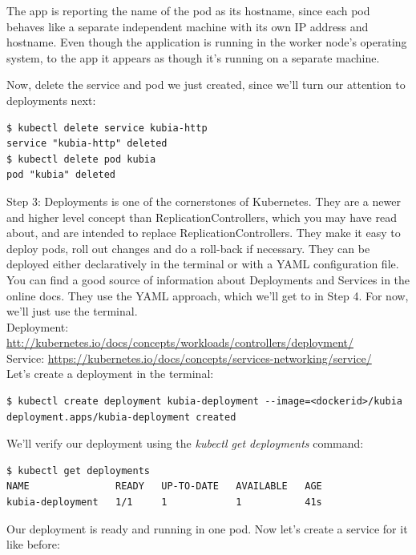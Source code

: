 \documentclass[a4paper,10pt]{article}
\begin{document}
The app is reporting the name of the pod as its hostname, since each pod behaves like a separate independent machine with its own IP address and hostname. Even though the application is running in the worker node's operating system, to the app it appears as though it's running on a separate machine.

Now, delete the service and pod we just created, since we'll turn our attention to deployments next:

\begin{lstlisting}[numbers=none, basicstyle=\ttfamily]
$ kubectl delete service kubia-http
service "kubia-http" deleted
$ kubectl delete pod kubia
pod "kubia" deleted
\end{lstlisting}

Step 3: Deployments is one of the cornerstones of Kubernetes. They are a newer and higher level concept than ReplicationControllers, which you may have read about, and are intended to replace ReplicationControllers.  They make it easy to deploy pods, roll out changes and do a roll-back if necessary. They can be deployed either declaratively in the terminal or with a YAML configuration file. You can find a good source of information about Deployments and Services in the online docs. They use the YAML approach, which we'll get to in Step 4. For now, we'll just use the terminal. \\

Deployment: \url{htt://kubernetes.io/docs/concepts/workloads/controllers/deployment/} \\
Service: \url{https://kubernetes.io/docs/concepts/services-networking/service/} \\

Let's create a deployment in the terminal:

\begin{lstlisting}[numbers=none, basicstyle=\ttfamily]
$ kubectl create deployment kubia-deployment --image=<dockerid>/kubia
deployment.apps/kubia-deployment created
\end{lstlisting}

We'll verify our deployment using the \textit{kubectl get deployments} command:

\begin{lstlisting}[numbers=none, basicstyle=\ttfamily]
$ kubectl get deployments
NAME               READY   UP-TO-DATE   AVAILABLE   AGE
kubia-deployment   1/1     1            1           41s
\end{lstlisting}

Our deployment is ready and running in one pod. Now let's create a service for it like before:
\end{document}
